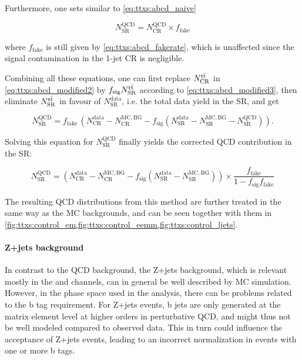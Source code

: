 Furthermore, one sets similar to \cref{eq:ttxs:abcd_naive}

\begin{equation}
\label{eq:ttxs:abcd_modified4}
    N^{\mathrm{QCD}}_{\mathrm{SR}} = N^{\mathrm{QCD}}_{\mathrm{CR}} \times f_{\mathrm{fake}}
\end{equation}

\noindent where $f_{\mathrm{fake}}$ is still given by \cref{eq:ttxs:abcd_fakerate}, which is unaffected since the \ttbar signal contamination in the 1-jet CR is negligible.

Combining all these equations, one can first replace $N^{\mathrm{t \bar{t}}}_{\mathrm{CR}}$ in \cref{eq:ttxs:abcd_modified2} by $f_{\mathrm{sig}} N^{\mathrm{t \bar{t}}}_{\mathrm{SR}}$ according to \cref{eq:ttxs:abcd_modified3}, then eliminate $N^{\mathrm{t \bar{t}}}_{\mathrm{SR}}$ in favour of $N^{\mathrm{data}}_{\mathrm{SR}}$, i.e. the total data yield in the SR, and get

\begin{equation}
    N^{\mathrm{QCD}}_{\mathrm{SR}} = f_{\mathrm{fake}} \, \left( N^{\mathrm{data}}_{\mathrm{CR}} - N^{\mathrm{MC,BG}}_{\mathrm{CR}} - f_{\mathrm{sig}} \left( N^{\mathrm{data}}_{\mathrm{SR}} - N^{\mathrm{MC,BG}}_{\mathrm{SR}} - N^{\mathrm{QCD}}_{\mathrm{SR}} \right) \right) .
\end{equation}

Solving this equation for $N^{\mathrm{QCD}}_{\mathrm{SR}}$ finally yields the corrected QCD contribution in the SR:

\begin{equation}
\label{eq:ttxs:abcd_modified}
    N^{\mathrm{QCD}}_{\mathrm{SR}} = \left( N^{\mathrm{data}}_{\mathrm{CR}} - N^{\mathrm{MC,BG}}_{\mathrm{CR}} - f_{\mathrm{sig}} ( N^{\mathrm{data}}_{\mathrm{SR}} - N^{\mathrm{MC,BG}}_{\mathrm{SR}} )\right)
    \times \frac{ f_{\mathrm{fake}} } {1 - f_{\mathrm{sig}} f_{\mathrm{fake}}}
\end{equation}

The resulting QCD distributions from this method are further treated in the same way as the MC backgrounds, and can be seen together with them in \cref{fig:ttxs:control_em,fig:ttxs:control_eemm,fig:ttxs:control_ljets}.
  

\paragraph{Z+jets background}

In contrast to the QCD background, the Z+jets background, which is relevant mostly in the \ee and \mumu channels, can in general be well described by MC simulation. However, in the phase space used in the analysis, there can be problems related to the b tag requirement. For Z+jets events, b jets are only generated at the matrix element level at higher orders in perturbative QCD, and might thus not be well modeled compared to observed data. This in turn could influence the acceptance of Z+jets events, leading to an incorrect normalization in events with one or more b tags.

